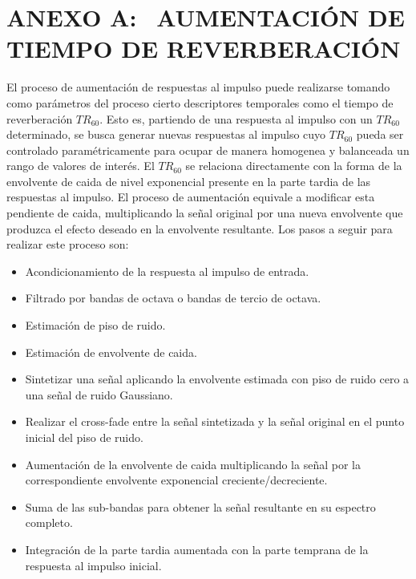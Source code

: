 \section[Aumentación de tiempo de reverberación]{ANEXO A:$\ \ \ \ $AUMENTACIÓN DE TIEMPO DE REVERBERACIÓN}

El proceso de aumentación de respuestas al impulso puede realizarse tomando como parámetros del proceso cierto descriptores temporales como el tiempo de reverberación $TR_{60}$. Esto es, partiendo de una respuesta al impulso con un $TR_{60}$ determinado, se busca generar nuevas respuestas al impulso cuyo $TR_{60}$ pueda ser controlado paramétricamente para ocupar de manera homogenea y balanceada un rango de valores de interés. 
El $TR_{60}$ se relaciona directamente con la forma de la envolvente de caida de nivel exponencial presente en la parte tardia de las respuestas al impulso. El proceso de aumentación equivale a modificar esta pendiente de caida, multiplicando la señal original por una nueva envolvente que produzca el efecto deseado en la envolvente resultante. Los pasos a seguir para realizar este proceso son: 

\begin{itemize}
  \item Acondicionamiento de la respuesta al impulso de entrada.
  \item Filtrado por bandas de octava o bandas de tercio de octava.
  \item Estimación de piso de ruido.
  \item Estimación de envolvente de caida.
  \item Sintetizar una señal aplicando la envolvente estimada con piso de ruido cero a una señal de ruido Gaussiano. 
  \item Realizar el cross-fade entre la señal sintetizada y la señal original en el punto inicial del piso de ruido.
  \item Aumentación de la envolvente de caida multiplicando la señal por la correspondiente envolvente exponencial creciente/decreciente.
  \item Suma de las sub-bandas para obtener la señal resultante en su espectro completo.
  \item Integración de la parte tardia aumentada con la parte temprana de la respuesta al impulso inicial.
\end{itemize} 	

